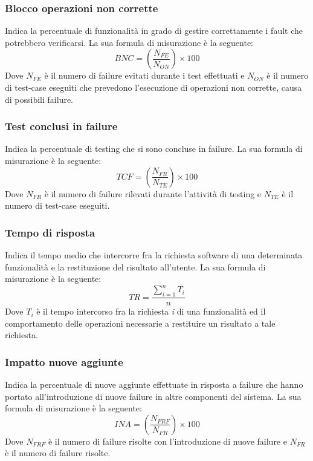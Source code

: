 		\subsubsection{Blocco operazioni non corrette} Indica la percentuale di funzionalità in grado di gestire correttamente i fault che
potrebbero verificarsi. La sua formula di misurazione è la seguente:
\newline
		\[
		BNC=(\frac{N_{FE}}{N_{ON}}) \times 100
		\]	
		Dove $N_{FE}$ è il numero di failure evitati durante i test effettuati e $N_{ON}$ è il numero
di test-case eseguiti che prevedono l’esecuzione di operazioni non corrette, causa
		di possibili failure.
		\subsubsection{Test conclusi in failure} Indica la percentuale di testing che si sono concluse in failure. La sua formula di
misurazione è la seguente:
 \newline
		\[
		TCF=(\frac{N_{FR}}{N_{TE}}) \times 100
		\]	
		Dove $N_{FR}$ è il numero di failure rilevati durante l'attività di testing e $N_{TE}$
è il numero di test-case eseguiti.
		\subsubsection{Tempo di risposta} Indica il tempo medio che intercorre fra la richiesta software di una determinata
funzionalità e la restituzione del risultato all’utente. La sua formula di misurazione
è la seguente:\newline
		\[
		TR=\frac{\sum_{i=1}^{n}T_i}{n}
		\]	
		Dove $T_i$ è il tempo intercorso fra la richiesta \textit{i} di una funzionalità ed il comportamento delle operazioni necessarie a restituire un risultato a tale richiesta.
		\subsubsection{Impatto nuove aggiunte} Indica la percentuale di nuove aggiunte effettuate in risposta a failure che hanno portato
all’introduzione di nuove failure in altre componenti del sistema. La sua formula
		di misurazione è la seguente:
\newline
		\[
		INA=(\frac{N_{FRF}}{N_{FR}}) \times 100
		\]
		Dove $N_{FRF}$ è il numero di failure risolte con l’introduzione di nuove failure e $N_{FR}$
		è il numero di failure risolte.